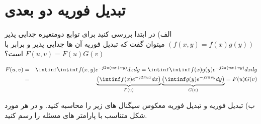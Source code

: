 \section{ تبدیل فوریه دو بعدی}

الف) در ابتدا بررسی کنید برای توابع دومتغیره جدایی پذیر
$(f(x,y)=f(x)g(y))$ میتوان گفت که تبدیل فوریه آن ها
جدایی پذیر و برابر با $F(u,v)=F(u)G(v)$ است؟

\begin{qsolve}[]
	\begin{eqnarray*}
		F(u,v)&=&\intinf\intinf f(x,y)e^{-j2\pi(ux+vy)}dxdy
		=\intinf\intinf f(x)g(y)e^{-j2\pi(ux+vy)}dxdy\\
		&=&\underbrace{\left(\intinf f(x)e^{-j2\pi ux}dx\right)}_{F(u)}
		\underbrace{\left(\intinf g(y)e^{-j2\pi vy}dy\right)}_{G(v)}
		=F(u)G(v)
	\end{eqnarray*}
\end{qsolve}

ب) تبدیل فوریه و تبدیل فوریه معکوس سیگنال های زیر را محاسبه کنید. و در هر مورد شکل متناسب با پارامتر های مسئله
را رسم کنید.

